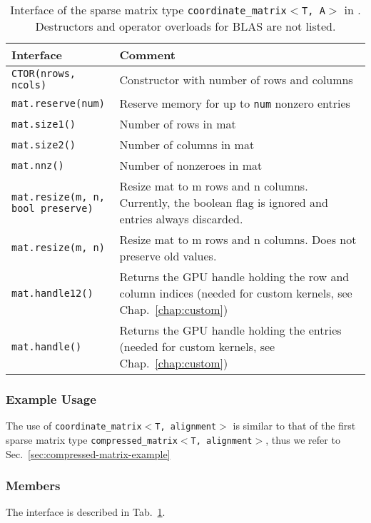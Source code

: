 \begin{table}[tb]
\begin{center}
\begin{tabular}{p{6.5cm}|p{8cm}}
Interface & Comment\\
\hline
\texttt{CTOR(nrows, ncols)}    & Constructor with number of rows and columns \\
\texttt{mat.reserve(num)}    & Reserve memory for up to \texttt{num} nonzero entries \\
\texttt{mat.size1()}            & Number of rows in mat \\
\texttt{mat.size2()}            & Number of columns in mat \\
\texttt{mat.nnz()}		& Number of nonzeroes in mat \\
\parbox{6cm}{\texttt{mat.resize(m, n, \\
           \hphantom{mat.resize(}bool preserve)}}    & Resize mat to m rows and n columns. Currently, the boolean flag is ignored and entries always discarded. \\
\texttt{mat.resize(m, n)}    & Resize mat to m rows and n columns. Does not preserve old values. \\
\texttt{mat.handle12()}  & Returns the GPU handle holding the row and column indices (needed for custom kernels, see Chap.~\ref{chap:custom}) \\
\texttt{mat.handle()}  & Returns the GPU handle holding the entries (needed for custom kernels, see Chap.~\ref{chap:custom})
\end{tabular}
\caption{Interface of the sparse matrix type \texttt{coordinate\_matrix$<$T, A$>$} in \ViennaCL. Destructors and operator overloads for BLAS are not listed.}
\label{tab:coordinate-matrix-interface}
\end{center}
\end{table}

\subsubsection{Example Usage}
The use of \texttt{coordinate\_matrix$<$T, alignment$>$} is similar to that of the first sparse matrix type 
\texttt{compressed\_matrix$<$T, alignment$>$}, thus we refer to Sec.~\ref{sec:compressed-matrix-example}


\subsubsection{Members}
The interface is described in Tab.~\ref{tab:coordinate-matrix-interface}. 

